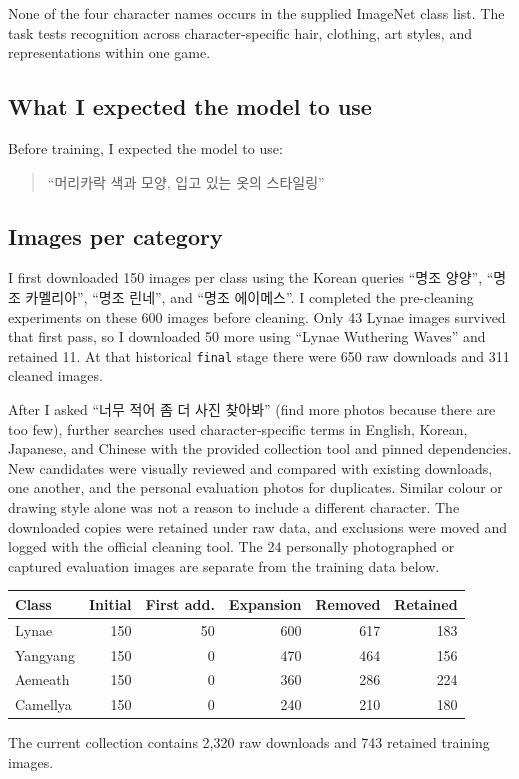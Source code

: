 \documentclass[11pt]{article}
\begin{document}
None of the four character names occurs in the supplied ImageNet class list. The task tests recognition across character-specific hair, clothing, art styles, and representations within one game.

\subsection*{What I expected the model to use}
Before training, I expected the model to use:
\begin{quote}
``머리카락 색과 모양, 입고 있는 옷의 스타일링''
\end{quote}

\subsection*{Images per category}
I first downloaded 150 images per class using the Korean queries ``명조 양양'', ``명조 카멜리아'', ``명조 린네'', and ``명조 에이메스''. I completed the pre-cleaning experiments on these 600 images before cleaning. Only 43 Lynae images survived that first pass, so I downloaded 50 more using ``Lynae Wuthering Waves'' and retained 11. At that historical \texttt{final} stage there were 650 raw downloads and 311 cleaned images.

After I asked ``너무 적어 좀 더 사진 찾아봐'' (find more photos because there are too few), further searches used character-specific terms in English, Korean, Japanese, and Chinese with the provided collection tool and pinned dependencies. New candidates were visually reviewed and compared with existing downloads, one another, and the personal evaluation photos for duplicates. Similar colour or drawing style alone was not a reason to include a different character. The downloaded copies were retained under raw data, and exclusions were moved and logged with the official cleaning tool. The 24 personally photographed or captured evaluation images are separate from the training data below.
\begin{center}\small
\begin{tabular}{lrrrrr}
\toprule
Class & Initial & First add. & Expansion & Removed & Retained \\
\midrule
Lynae & 150 & 50 & 600 & 617 & 183 \\
Yangyang & 150 & 0 & 470 & 464 & 156 \\
Aemeath & 150 & 0 & 360 & 286 & 224 \\
Camellya & 150 & 0 & 240 & 210 & 180 \\
\bottomrule
\end{tabular}
\end{center}
The current collection contains 2,320 raw downloads and 743 retained training images.
\end{document}
